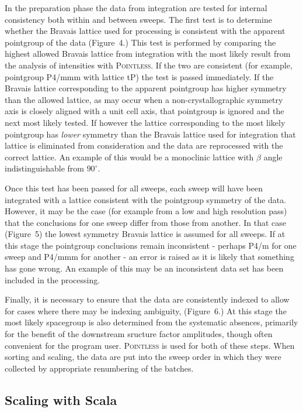 \documentclass[preprint,pdf]{iucr}
\begin{document}
In the preparation phase the data from integration are tested for
internal consistency both within and between sweeps. The first test is
to determine whether the Bravais lattice used for processing is
consistent with the apparent pointgroup of the data
(Figure~4.)
This test is performed by comparing the highest allowed Bravais
lattice from integration with the most likely result from 
the analysis of intensities with \textsc{Pointless}. If
the two are consistent (for example, pointgroup P4/mmm with lattice tP)
the test is passed immediately. If the Bravais lattice corresponding
to the apparent pointgroup has higher
symmetry than the allowed lattice, as may occur when a
non-crystallographic symmetry axis is closely aligned with a unit cell
axis, that pointgroup is ignored and the next most likely tested. 
If however the lattice corresponding to the most likely pointgroup has 
\emph{lower} symmetry than the
Bravais lattice used for integration that lattice is eliminated from
consideration and the data are reprocessed with the correct lattice.
An example of this would
be a monoclinic lattice with $\beta$ angle indistinguishable
from $90^{\circ}$. 

Once this test has been passed for all sweeps, each sweep will have been
integrated with a lattice consistent with the pointgroup symmetry of
the data. However, it may be the case (for example from a low and high
resolution pass) that the conclusions for one sweep differ from those
from another. In that case (Figure~5) the lowest
symmetry Bravais lattice
is assumed for all sweeps. If at this stage the pointgroup
conclusions remain inconsistent - perhaps P4/m for one sweep and 
P4/mmm for another - an error is raised as it is likely
that something has gone wrong. An example of this may be an
inconsistent data set has been included in the processing. 

Finally, it is necessary to ensure that the data are consistently
indexed to allow for cases where there may be indexing ambiguity,
(Figure~6.) At this stage the most likely
spacegroup is also determined from the systematic absences, primarily
for the benefit of the downstream sructure factor amplitudes, though
often convenient for the program user. \textsc{Pointless} is used for
both of these steps. When sorting and scaling, the
data are put into the sweep order in which they were collected by
appropriate renumbering of the batches.

\subsection{Scaling with Scala}
\end{document}
